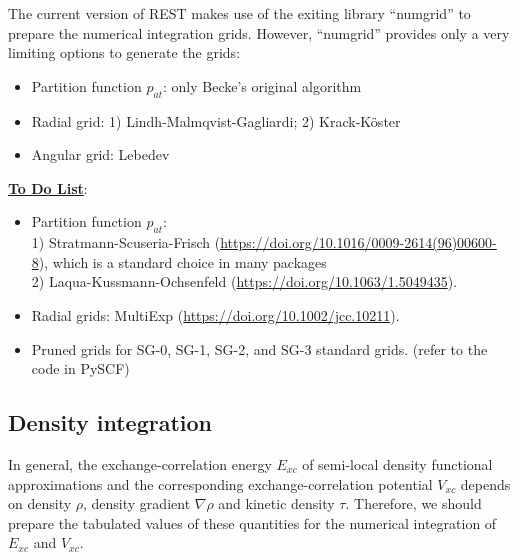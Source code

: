 \documentclass[a4paper,12pt]{article}
\begin{document}
 The current version of REST makes use of the exiting library ``numgrid'' to prepare the numerical integration grids. However,
 ``numgrid'' provides only a very limiting options to generate the grids:
 \begin{itemize}
 \item Partition function $p_{at}$: only Becke's original algorithm
 \item Radial grid: 1) Lindh-Malmqvist-Gagliardi; 2) Krack-K\"oster
 \item Angular grid: Lebedev
 \end{itemize}

 \textbf{\underline{To Do List}}:
 \begin{itemize}
	 \item Partition function $p_{at}$: \\
		   1) Stratmann-Scuseria-Frisch (\url{https://doi.org/10.1016/0009-2614(96)00600-8}), which is a standard choice in many packages\\
		   2) Laqua-Kussmann-Ochsenfeld (\url{https://doi.org/10.1063/1.5049435}).
	 \item Radial grids: MultiExp (\url{https://doi.org/10.1002/jcc.10211}).
	 \item Pruned grids for SG-0, SG-1, SG-2, and SG-3 standard grids. (refer to the code in PySCF)
\end{itemize}


\subsection{Density integration}
In general, the exchange-correlation energy $E_{xc}$ of semi-local density functional approximations and 
the corresponding exchange-correlation potential $V_{xc}$ depends on density $\rho$, density gradient 
$\nabla \rho$ and kinetic density $\tau$. Therefore, we should prepare the tabulated values of these quantities 
for the numerical integration of $E_{xc}$ and $V_{xc}$.
\end{document}
